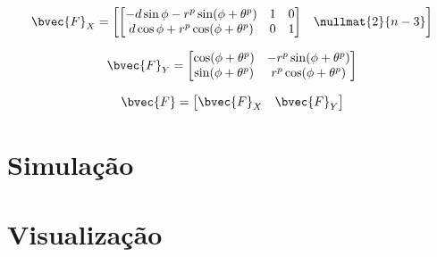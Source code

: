 \begin{equation}
  \bvec{F}_X = 
    \begin{bmatrix}
      \begin{bmatrix}
          -d \sin{\phi} - r^p \sin(\phi + \theta^p)  & 1 & 0\\
          d\cos{\phi} + r^p\cos(\phi + \theta^p) & 0 & 1
      \end{bmatrix} & \nullmat{2}{n-3} \end{bmatrix}
  \label{eq:inverse-measurement-model-jacobian-state-part}
\end{equation}

\begin{equation}
  \bvec{F}_Y = \begin{bmatrix}
       \cos(\phi + \theta^p) & -r^p\sin(\phi + \theta^p)\\
       \sin(\phi + \theta^p) & r^p\cos(\phi + \theta^p)
    \end{bmatrix}   
  \label{eq:inverse-measurement-model-jacobian-measurement-part}
\end{equation}

\begin{equation}
  \bvec{F} = \begin{bmatrix}
    \bvec{F}_X & \bvec{F}_Y
  \end{bmatrix}
  \label{eq:inverse-measurement-model-jacobian-full}
\end{equation}

\section{Simulação}

\section{Visualização}
